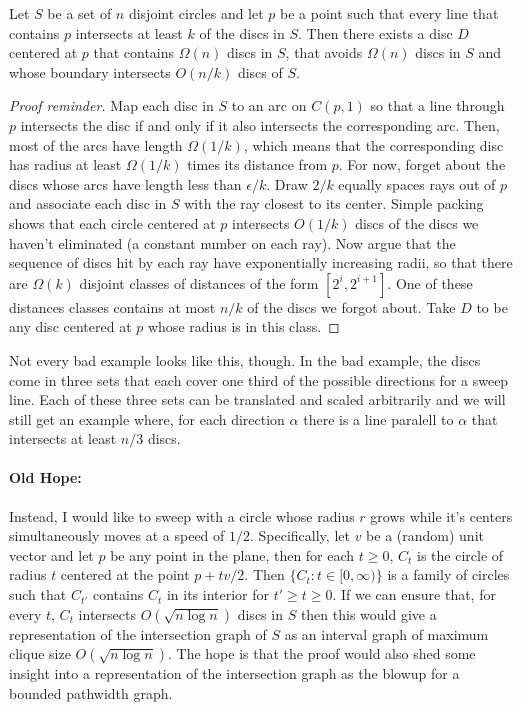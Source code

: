 \documentclass{patmorin}
\renewcommand{\ge}{\geqslant}
\begin{document}
\begin{lem}
  Let $S$ be a set of $n$ disjoint circles and let $p$ be a point such that every line that contains $p$ intersects at least $k$ of the discs in $S$.  Then there exists a disc $D$ centered at $p$ that contains $\Omega(n)$ discs in $S$, that avoids $\Omega(n)$ discs in $S$ and whose boundary intersects $O(n/k)$ discs of $S$.
\end{lem}

\begin{proof}[Proof reminder]
  Map each disc in $S$ to an arc on $C(p,1)$ so that a line through $p$ intersects the disc if and only if it also intersects the corresponding arc.  Then, most of the arcs have length $\Omega(1/k)$, which means that the corresponding disc has radius at least $\Omega(1/k)$ times its distance from $p$.  For now, forget about the discs whose arcs have length less than $\epsilon/ k$.  Draw $2/k$ equally spaces rays out of $p$ and associate each disc in $S$ with the ray closest to its center.  Simple packing shows that each circle centered at $p$ intersects $O(1/k)$ discs of the discs we haven't eliminated (a constant number on each ray).  Now argue that the sequence of discs hit by each ray have exponentially increasing radii, so that there are  $\Omega(k)$ disjoint classes of distances of the form $[2^i,2^{i+1}]$.  One of these distances classes contains at most $n/k$ of the discs we forgot about.  Take $D$ to be any disc centered at $p$ whose radius is in this class.
\end{proof}

Not every bad example looks like this, though.  In the bad example, the discs come in three sets that each cover one third of the possible directions for a sweep line.  Each of these three sets can be translated and scaled arbitrarily and we will still get an example where, for each direction $\alpha$ there is a line paralell to $\alpha$ that intersects at least $n/3$ discs.


\paragraph{Old Hope:}

Instead, I would like to sweep with a circle whose radius $r$ grows while it's centers simultaneously moves at a speed of $1/2$.  Specifically, let $v$ be a (random) unit vector and let $p$ be any point in the plane, then for each $t\ge 0$, $C_t$ is the circle of radius $t$ centered at the point $p+tv/2$. Then $\{C_t: t\in[0,\infty)\}$ is a family of circles such that $C_{t'}$ contains $C_t$ in its interior for $t'\ge t\ge 0$.  If we can ensure that, for every $t$, $C_t$ intersects $O(\sqrt{n\log n})$ discs in $S$ then this would give a representation of the intersection graph of $S$ as an interval graph of maximum clique size $O(\sqrt{n\log n})$.  The hope is that the proof would also shed some insight into a representation of the intersection graph as the blowup for a bounded pathwidth graph.
\end{document}
